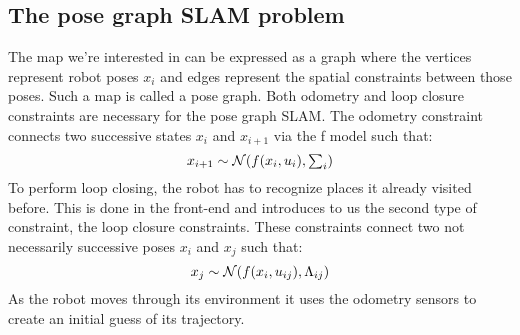 \documentclass[9pt,technote]{IEEEtran}
\begin{document}
\subsection{The pose graph SLAM problem}
The map we're interested in can be expressed as a graph where the vertices represent robot poses $x_i$ and edges represent the spatial constraints between those poses. Such a map is called a pose graph.
Both odometry and loop closure constraints are necessary for the pose graph 
SLAM.
The odometry constraint connects two successive states $x_{i}$ and $x_{i+1}$ via the f model such that: 
\begin{equation}
\centerline{$x_{i+1} \sim \mathcal{N}(f(x_i,u_i),\sum_i) $}
\end{equation}
To perform loop closing, the robot has to recognize places it already visited before. This is done in the front-end and introduces to us the second type of constraint, the loop closure constraints.
These constraints connect two not necessarily successive poses $x_i$ and $x_j$ such that: 
\begin{equation}
\centerline{$x_j \sim \mathcal{N}(f(x_{i},u_{ij}),\Lambda_{ij}) $}
\end{equation}
As the robot moves through its environment it uses the odometry sensors to create an initial guess of its trajectory. 
\end{document}
